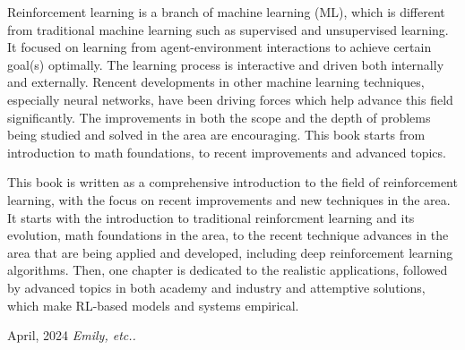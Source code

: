 %
%

\preface
\vspace{-\baselineskip}
\vspace{-\baselineskip}
\vspace{-\baselineskip}
\vspace{-\baselineskip}
\vspace{-\baselineskip}
\vspace{-\baselineskip}
\vspace{-\baselineskip}
\vspace{-\baselineskip}
Reinforcement learning is a branch of machine learning (ML), which is different from traditional machine learning such as supervised and unsupervised learning. 
It focused on learning from agent-environment interactions to achieve certain goal(s) optimally. The learning process is interactive and driven both internally and externally.
Rencent developments in other machine learning techniques, especially neural networks, have been driving forces which help advance this field significantly. 
The improvements in both the scope and the depth of problems being studied and solved in the area are encouraging.
This book starts from introduction to math foundations, to recent improvements and advanced topics.
\vspace{\baselineskip}


\noindent This book is written as a comprehensive introduction to the field of reinforcement learning, with the focus on recent improvements and new techniques in the area. 
It starts with the introduction to traditional reinforcment learning and its evolution, math foundations in the area, to the recent technique advances in the area 
that are being applied and developed, including deep reinforcement learning algorithms. Then, one chapter is dedicated to the realistic applications,
followed by advanced topics in both academy and industry and attemptive solutions, which make RL-based models and systems empirical.



\vspace{\baselineskip}
\begin{flushright}\noindent
April, 2024 \hfill {\it Emily, etc..}\\
\end{flushright}


